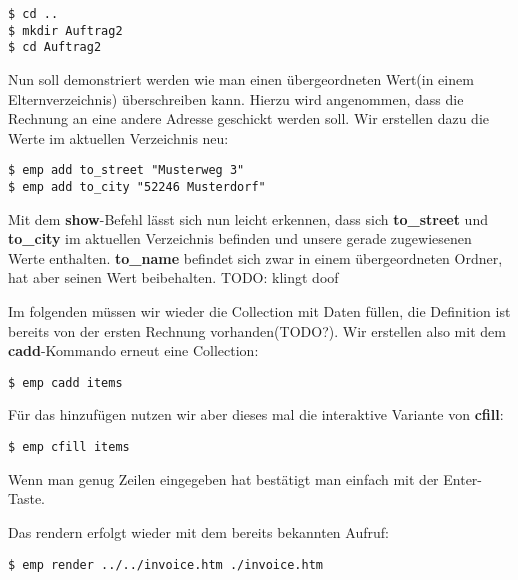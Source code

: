 \begin{lstlisting}[style=Bash]
$ cd ..
$ mkdir Auftrag2
$ cd Auftrag2
\end{lstlisting}

Nun soll demonstriert werden wie man einen übergeordneten Wert(in einem Elternverzeichnis) überschreiben kann. Hierzu wird angenommen, dass die Rechnung an eine andere Adresse geschickt werden soll. Wir erstellen dazu die Werte im aktuellen Verzeichnis neu:

\begin{lstlisting}[style=Bash]
$ emp add to_street "Musterweg 3"
$ emp add to_city "52246 Musterdorf"
\end{lstlisting}

Mit dem \textbf{show}-Befehl lässt sich nun leicht erkennen, dass sich \textbf{to_street} und \textbf{to_city} im aktuellen Verzeichnis befinden und unsere gerade zugewiesenen Werte enthalten.
\textbf{to_name} befindet sich zwar in einem übergeordneten Ordner, hat aber seinen Wert beibehalten. TODO: klingt doof  

Im folgenden müssen wir wieder die Collection mit Daten füllen, die Definition ist bereits von der ersten Rechnung vorhanden(TODO?). Wir erstellen also mit dem \textbf{cadd}-Kommando erneut eine Collection:
\begin{lstlisting}[style=Bash]
$ emp cadd items
\end{lstlisting}

Für das hinzufügen nutzen wir aber dieses mal die interaktive Variante von \textbf{cfill}:
\begin{lstlisting}[style=Bash]
$ emp cfill items
\end{lstlisting}
Wenn man genug Zeilen eingegeben hat bestätigt man einfach mit der Enter-Taste.

Das rendern erfolgt wieder mit dem bereits bekannten Aufruf:

\begin{lstlisting}[style=Bash]
$ emp render ../../invoice.htm ./invoice.htm
\end{lstlisting}
